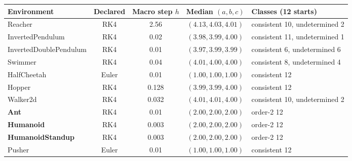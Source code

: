 \begin{tabular}{lcccl}
\toprule
Environment & Declared & Macro step $h$ & Median $(a,b,c)$ & Classes (12 starts) \\
\midrule
Reacher & RK4 & 2.56 & $(4.13,4.03,4.01)$ & consistent 10, undetermined 2 \\
InvertedPendulum & RK4 & 0.02 & $(3.98,3.99,4.00)$ & consistent 11, undetermined 1 \\
InvertedDoublePendulum & RK4 & 0.01 & $(3.97,3.99,3.99)$ & consistent 6, undetermined 6 \\
Swimmer & RK4 & 0.04 & $(4.01,4.00,4.00)$ & consistent 8, undetermined 4 \\
HalfCheetah & Euler & 0.01 & $(1.00,1.00,1.00)$ & consistent 12 \\
Hopper & RK4 & 0.128 & $(3.99,3.99,4.00)$ & consistent 12 \\
Walker2d & RK4 & 0.032 & $(4.01,4.01,4.00)$ & consistent 10, undetermined 2 \\
\textbf{Ant} & RK4 & 0.01 & $(2.00,2.00,2.00)$ & order-2 12 \\
\textbf{Humanoid} & RK4 & 0.003 & $(2.00,2.00,2.00)$ & order-2 12 \\
\textbf{HumanoidStandup} & RK4 & 0.003 & $(2.00,2.00,2.00)$ & order-2 12 \\
Pusher & Euler & 0.01 & $(1.00,1.00,1.00)$ & consistent 12 \\
\bottomrule
\end{tabular}
